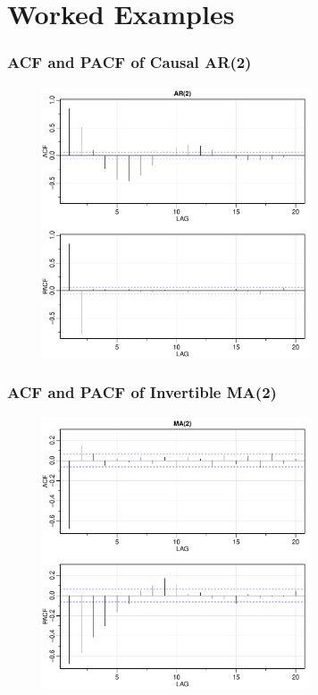 \documentclass[%
xcolor=pdftex]{beamer}
\begin{document}
\section{Worked Examples}
\frame{\tableofcontents[currentsection]}

\begin{frame}
\frametitle{ACF and PACF of Causal AR(2)}

\includegraphics[width=100mm, height=80mm]{ar.pdf}

\end{frame}

\begin{frame}
\frametitle{ACF and PACF of Invertible MA(2)}

\includegraphics[width=100mm, height=80mm]{ma.pdf}

\end{frame}
\end{document}

